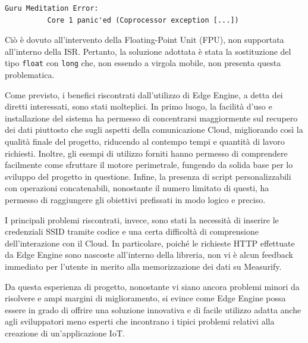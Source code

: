 \begin{verbatim}
Guru Meditation Error: 
          Core 1 panic'ed (Coprocessor exception [...])
\end{verbatim}

Ciò è dovuto all'intervento della Floating-Point Unit (FPU), non supportata all'interno della ISR. Pertanto, la soluzione adottata è stata la sostituzione del tipo \texttt{float} con \texttt{long} che, non essendo a virgola mobile, non presenta questa problematica.

Come previsto, i benefici riscontrati dall'utilizzo di Edge Engine, a detta dei diretti interessati,  sono stati molteplici. In primo luogo, la facilità d'uso e installazione del sistema ha permesso di concentrarsi maggiormente sul recupero dei dati piuttosto che sugli aspetti della comunicazione Cloud, migliorando così la qualità finale del progetto, riducendo al contempo tempi e quantità di lavoro richiesti. Inoltre, gli esempi di utilizzo forniti hanno permesso di comprendere facilmente come sfruttare il motore perimetrale, fungendo da solida base per lo sviluppo del progetto in questione. Infine, la presenza di script personalizzabili con operazioni concatenabili, nonostante il numero limitato di questi, ha permesso di raggiungere gli obiettivi prefissati in modo logico e preciso.

I principali problemi riscontrati, invece, sono stati la necessità di inserire le credenziali SSID tramite codice e una certa difficoltà di comprensione dell'interazione con il Cloud. In particolare, poiché le richieste HTTP effettuate da Edge Engine sono nascoste all'interno della libreria, non vi è alcun feedback immediato per l'utente in merito alla memorizzazione dei dati su Measurify.

Da questa esperienza di progetto, nonostante vi siano ancora problemi minori da risolvere e ampi margini di miglioramento, si evince come Edge Engine possa essere in grado di offrire una soluzione innovativa e di facile utilizzo adatta anche agli sviluppatori meno esperti che incontrano i tipici problemi relativi alla creazione di un'applicazione IoT.



